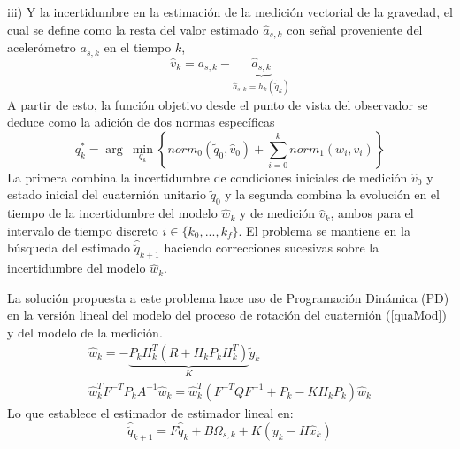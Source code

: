 \documentclass[conference]{IEEEtran}
\begin{document}
iii) Y la incertidumbre en la estimación de la medición vectorial de la gravedad, el cual se define como la resta del valor estimado $\hat{a}_{s,k}$ con señal proveniente del acelerómetro $a_{s,k}$ en el tiempo $k$,
\begin{equation}
\hat{v}_k=a_{s,k}-\underbrace{\hat{a}_{s,k}}_{\hat{a}_{s,k}=h_k(\hat{\breve{q}}_k)}
\end{equation}
A partir de esto, la función objetivo desde el punto de vista del observador se deduce como la adición de dos normas específicas
\begin{equation}
q^*_k=\arg~\min_{q_k}\left\{norm_0(\tilde{q}_0,\hat{v}_0)+\sum^k_{i=0}norm_1(w_i,v_i)\right\}
\end{equation}
La primera combina la incertidumbre de condiciones iniciales de medición $\hat{v}_0$ y estado inicial del cuaternión unitario $\tilde{q}_0$ y la segunda combina la evolución en el tiempo de la incertidumbre del modelo $\hat{w}_k$ y de medición $\hat{v}_k$, ambos para el intervalo de tiempo discreto $i\in\{k_0,...,k_f\}$. El problema se mantiene en la búsqueda del estimado $\hat{\breve{q}}_{k+1}$ haciendo correcciones sucesivas sobre la incertidumbre del modelo $\hat{w}_k$.\par
La solución propuesta a este problema hace uso de Programación Dinámica (PD) \cite{Lewis2012} en la versión lineal del modelo del proceso de rotación del cuaternión (\ref{quaMod}) y del modelo de la medición.
\begin{gather}
\hat{w}_{k}=-\underbrace{P_kH_k^T(R+H_kP_kH_k^T)}_K\tilde{y}_k\\
\hat{w}_k^TF^{-T}P_kA^{-1}\hat{w}_k=\hat{w}_k^T(F^{-T}QF^{-1}+P_k-KH_kP_k)\hat{w}_k
\end{gather}
Lo que establece el estimador de estimador lineal en:
\begin{equation}\label{chap2:ObservadorLineal}
\hat{\breve{q}}_{k+1}=F\hat{\breve{q}}_k+B\Omega_{s,k}+K(y_k-H\hat{x}_k)
\end{equation}
\end{document}
